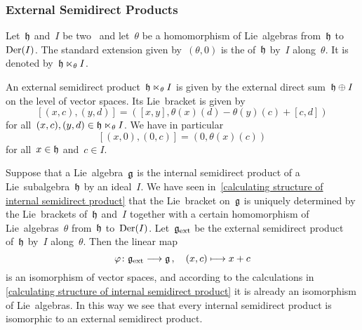 \subsubsection{External Semidirect Products}

\begin{definition}
  Let~$\mathfrak{h}$ and~$I$ be two~\liealgebras{$\kf$} and let~$\theta$ be a homomorphism of Lie~algebras from~$\mathfrak{h}$ to~$\operatorname{Der}(I)$.
  The standard extension given by~$(\theta, 0)$ is the  of~$\mathfrak{h}$ by~$I$ along~$\theta$.
  It is denoted by~$\mathfrak{h} \ltimes_\theta I$.
\end{definition}


\begin{remark}
  An external semidirect product~$\mathfrak{h} \ltimes_\theta I$ is given by the external direct sum~$\mathfrak{h} \oplus I$ on the level of vector spaces.
  Its Lie~bracket is given by
  \[
    [ (x,c), (y,d) ]
    =
    ( [x,y], \theta(x)(d) - \theta(y)(c) + [c,d] )
  \]
  for all~$(x,c), (y,d) \in \mathfrak{h} \ltimes_\theta I$.
  We have in particular
  \[
    [(x,0), (0,c)]
    =
    ( 0, \theta(x)(c) )
  \]
  for all~$x \in \mathfrak{h}$ and~$c \in I$.
\end{remark}


\begin{fluff}
  \label{internal semidirect product is also external}
  Suppose that a Lie~algebra~$\mathfrak{g}$ is the internal semidirect product of a Lie~subalgebra~$\mathfrak{h}$ by an ideal~$I$.
  We have seen in~\cref{calculating structure of internal semidirect product} that the Lie~bracket on~$\mathfrak{g}$ is uniquely determined by the Lie~brackets of~$\mathfrak{h}$ and~$I$ together with a certain homomorphism of Lie~algebras~$\theta$ from~$\mathfrak{h}$ to~$\operatorname{Der}(I)$.
  Let~$\mathfrak{g}_{\mathrm{ext}}$ be the external semidirect product of~$\mathfrak{h}$ by~$I$ along~$\theta$.
  Then the linear map
  \[
    \varphi
    \colon
    \glie_{\ext}
    \to
    \glie \,,
    \quad
    (x, c)
    \mapsto
    x + c
  \]
  is an isomorphism of vector spaces, and according to the calculations in \cref{calculating structure of internal semidirect product} it is already an isomorphism of Lie~algebras.
  In this way we see that every internal semidirect product is isomorphic to an external semidirect product.
\end{fluff}


